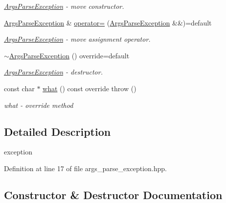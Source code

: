 \begin{DoxyCompactItemize}
\begin{DoxyCompactList}\small\item\em \hyperlink{classmin__path_1_1argument__parser_1_1_args_parse_exception}{Args\+Parse\+Exception} -\/ move constructor. \end{DoxyCompactList}\item 
\hyperlink{classmin__path_1_1argument__parser_1_1_args_parse_exception}{Args\+Parse\+Exception} \& \hyperlink{classmin__path_1_1argument__parser_1_1_args_parse_exception_a995afc8f785651694e33408b2640a608}{operator=} (\hyperlink{classmin__path_1_1argument__parser_1_1_args_parse_exception}{Args\+Parse\+Exception} \&\&)=default
\begin{DoxyCompactList}\small\item\em \hyperlink{classmin__path_1_1argument__parser_1_1_args_parse_exception}{Args\+Parse\+Exception} -\/ move assignment operator. \end{DoxyCompactList}\item 
\hyperlink{classmin__path_1_1argument__parser_1_1_args_parse_exception_aa3c9c74381ce991e447711de119f9bb3}{$\sim$\+Args\+Parse\+Exception} () override=default
\begin{DoxyCompactList}\small\item\em \hyperlink{classmin__path_1_1argument__parser_1_1_args_parse_exception}{Args\+Parse\+Exception} -\/ destructor. \end{DoxyCompactList}\item 
const char $\ast$ \hyperlink{classmin__path_1_1argument__parser_1_1_args_parse_exception_af541e83d297eb66a959230e739b0349f}{what} () const override  throw ()
\begin{DoxyCompactList}\small\item\em what -\/ override method \end{DoxyCompactList}\end{DoxyCompactItemize}


\subsection{Detailed Description}
exception 

Definition at line 17 of file args\+\_\+parse\+\_\+exception.\+hpp.



\subsection{Constructor \& Destructor Documentation}
